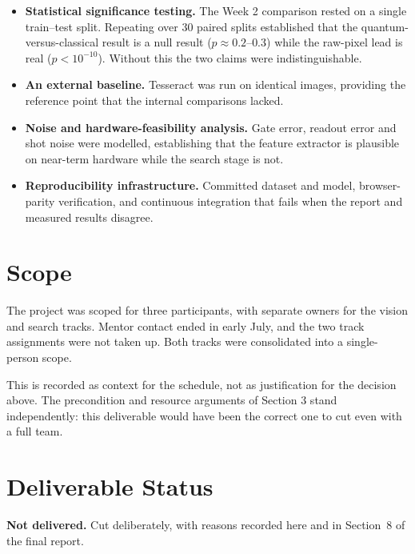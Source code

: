 \documentclass[11pt,a4paper]{article}
\begin{document}
\begin{itemize}
\item \textbf{Statistical significance testing.} The Week 2 comparison rested on
      a single train--test split. Repeating over 30 paired splits established
      that the quantum-versus-classical result is a null result
      ($p \approx 0.2$--$0.3$) while the raw-pixel lead is real
      ($p < 10^{-10}$). Without this the two claims were indistinguishable.
\item \textbf{An external baseline.} Tesseract was run on identical images,
      providing the reference point that the internal comparisons lacked.
\item \textbf{Noise and hardware-feasibility analysis.} Gate error, readout error
      and shot noise were modelled, establishing that the feature extractor is
      plausible on near-term hardware while the search stage is not.
\item \textbf{Reproducibility infrastructure.} Committed dataset and model,
      browser-parity verification, and continuous integration that fails when the
      report and measured results disagree.
\end{itemize}

\section{Scope}
\label{sec:scope}

The project was scoped for three participants, with separate owners for the
vision and search tracks. Mentor contact ended in early July, and the two track
assignments were not taken up. Both tracks were consolidated into a single-person
scope.

This is recorded as context for the schedule, not as justification for the
decision above. The precondition and resource arguments of Section 3 stand
independently: this deliverable would have been the correct one to cut even with
a full team.

\section{Deliverable Status}

\textbf{Not delivered.} Cut deliberately, with reasons recorded here and in
Section~8 of the final report.
\end{document}
